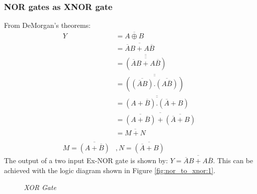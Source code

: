 		\subsubsection{NOR gates as XNOR gate}
		From DeMorgan’s theorems:
		\begin{align*}
			Y &= \overline{A \oplus B} \\
			&= \overline{\overline{A}B + A\overline{B}} \\
			&= \overline{\overline{(\overline{\overline{A}B + A\overline{B}})}} \\
			&= \overline{\overline{(\overline{(\overline{A}B)} . \overline{(A\overline{B})})}} \\
			&= \overline{\overline{(A+\overline{B}) . (\overline{A} + B)}} \\
			&= \overline{\overline{(A+\overline{B})} + \overline{(\overline{A} + B)}} \\
			&= \overline{M + N} \\
			\\
			M = \overline{(A+\overline{B})} &, N = \overline{(\overline{A} + B)}
		\end{align*}
		The output of a two input Ex-NOR gate is shown by: $Y = \overline{\overline{A}B + A\overline{B}}$. This can be achieved with the logic diagram shown in Figure \ref{fig:nor_to_xnor:1}.
		\begin{figure}[ht]
			\centering
			\hfill
			\caption{\textit{XOR Gate}}
		\end{figure}


